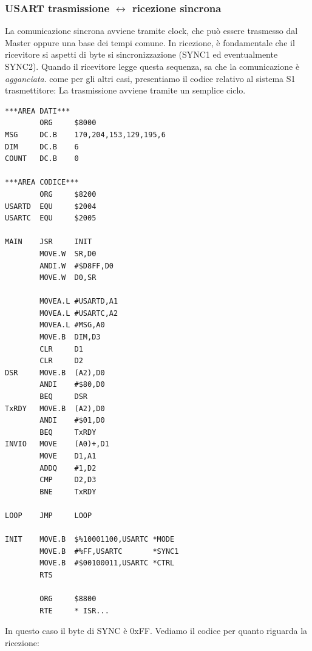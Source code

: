\subsubsection{USART trasmissione $\leftrightarrow$ ricezione sincrona}
La comunicazione sincrona avviene tramite clock, che può essere trasmesso dal Master oppure una base dei tempi comune. In ricezione, è fondamentale che il ricevitore si aspetti di byte si sincronizzazione (SYNC1 ed eventualmente SYNC2). Quando il ricevitore legge questa sequenza, sa che la comunicazione è \textit{agganciata}. come per gli altri casi, presentiamo il codice relativo al sistema S1 trasmettitore: La trasmissione avviene tramite un semplice ciclo.

\begin{lstlisting}
***AREA DATI***
        ORG     $8000
MSG     DC.B    170,204,153,129,195,6
DIM     DC.B    6
COUNT   DC.B    0

***AREA CODICE***
        ORG     $8200
USARTD  EQU     $2004
USARTC  EQU     $2005

MAIN    JSR     INIT 
        MOVE.W  SR,D0
        ANDI.W  #$D8FF,D0
        MOVE.W  D0,SR 

        MOVEA.L #USARTD,A1 
        MOVEA.L #USARTC,A2 
        MOVEA.L #MSG,A0 
        MOVE.B  DIM,D3 
        CLR     D1 
        CLR     D2 
DSR     MOVE.B  (A2),D0 
        ANDI    #$80,D0 
        BEQ     DSR 
TxRDY   MOVE.B  (A2),D0 
        ANDI    #$01,D0 
        BEQ     TxRDY 
INVIO   MOVE    (A0)+,D1 
        MOVE    D1,A1 
        ADDQ    #1,D2 
        CMP     D2,D3
        BNE     TxRDY 

LOOP    JMP     LOOP 

INIT    MOVE.B  $%10001100,USARTC *MODE
        MOVE.B  #%FF,USARTC       *SYNC1 
        MOVE.B  #$00100011,USARTC *CTRL 
        RTS

        ORG     $8800
        RTE     * ISR...

\end{lstlisting}
In questo caso il byte di SYNC è 0xFF. Vediamo il codice per quanto riguarda la ricezione:

